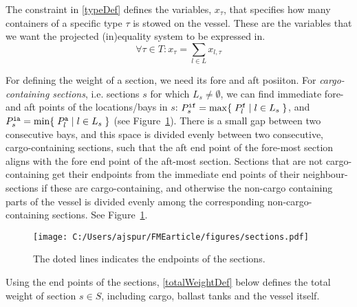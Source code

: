 The constraint in \eqref{typeDef} defines the variables, $x_\tau$, that specifies how many containers of a specific type $\tau$ is stowed on the vessel. These are the variables that we want the projected (in)equality system to be expressed in.
\begin{equation}
\label{typeDef}
	\forall{\tau \in T}: x_\tau = \sum_{l\in L} x_{l,\tau}
\end{equation}

For defining the weight of a section, we need its fore and aft posiiton. For \emph{cargo-containing sections}, i.e. sections $s$ for which $L_s\neq \emptyset$, we can find immediate fore- and aft points of the locations/bays in $s$: $P^{\texttt{if}}_s = \max\{\;{P^{\texttt{f}}_l}\;|\;{l\in L_s}\;\}$, and $P^{\texttt{ia}}_s = \min\{\;{P^{\texttt{a}}_l}\;|\;{l\in L_s}\;\}$ (see Figure~\ref{fig:sections}). 
There is a small gap between two consecutive bays, and this space is divided evenly between two consecutive, cargo-containing sections, such that the aft end point of the fore-most section aligns with the fore end point of the aft-most section. Sections that are not cargo-containing get their endpoints from the immediate end points of their neighbour-sections if these are cargo-containing, and otherwise the non-cargo containing parts of the vessel is divided evenly among the corresponding non-cargo-containing sections. See Figure~\ref{fig:sections}.

\begin{figure}
	\centering
		\texttt{[image: C:/Users/ajspur/FMEarticle/figures/sections.pdf]}
	\caption{The doted lines indicates the endpoints of the sections.}
	\label{fig:sections}
\end{figure}

Using the end points of the sections, \eqref{totalWeightDef} below defines the total weight of section $s\in S$, including cargo, ballast tanks and the vessel itself.   

